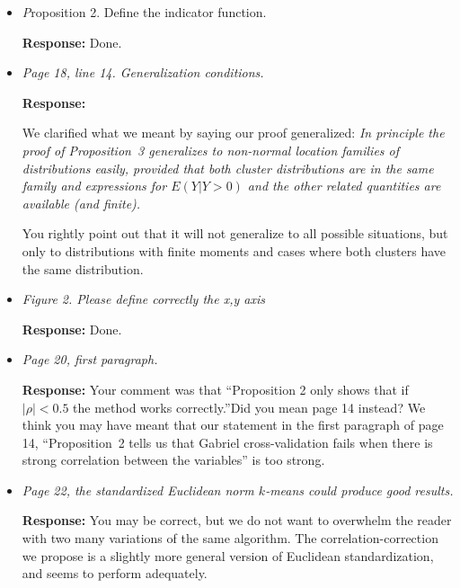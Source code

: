 \documentclass[11pt]{article}
\begin{document}
\begin{itemize}
% 
% 
% 


\item {\textit Proposition 2. Define the indicator function.}

\textbf{Response:} Done.


\item \textit{Page 18, line 14. Generalization conditions.}

\textbf{Response:} 

We clarified what we meant by saying our proof generalized:
\textit{
In principle the proof of Proposition~3 generalizes to
non-normal location families of distributions easily, provided that
both cluster distributions are in the same family and expressions for
$E(Y | Y > 0)$ and the other related quantities are available (and finite).
}

You rightly point out that it will not generalize to all possible situations,
but only to distributions with finite moments and cases where both clusters
have the same distribution.


\item \textit{Figure 2. Please define correctly the x,y axis}

\textbf{Response:} Done.


\item \textit{Page 20, first paragraph.}

\textbf{Response:} Your comment was that ``Proposition 2 only shows that if
$|\rho|<0.5$ the method works correctly.''Did you mean page 14 instead?  We
think you may have meant that our statement in the first paragraph of  page
14, ``Proposition~2 tells us that Gabriel cross-validation fails when there is
strong correlation between the variables'' is too strong.


\item \textit{Page 22, the standardized Euclidean norm $k$-means could produce
good results.}

\textbf{Response:} You may be correct, but we do not want to overwhelm the
reader with two many variations of the same algorithm. The correlation-correction
we propose is a slightly more general version of Euclidean standardization,
and seems to perform adequately.


\end{itemize}
\end{document}
